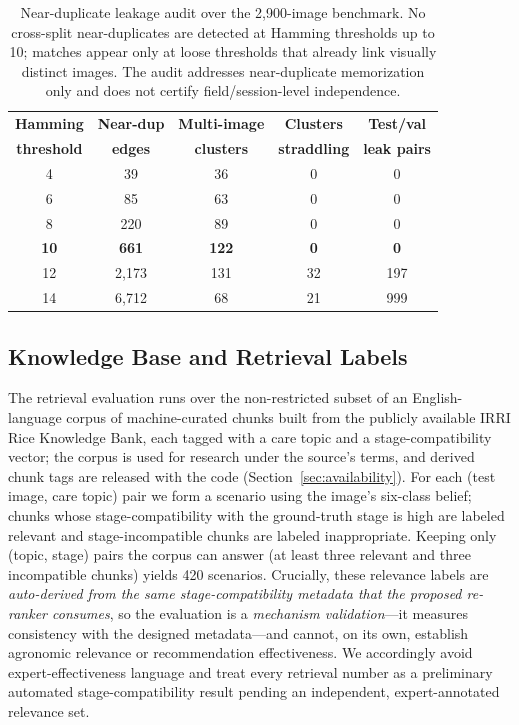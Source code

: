 \documentclass{llncs}
\begin{document}
\begin{table}[t]
\centering
\caption{Near-duplicate leakage audit over the 2{,}900-image benchmark. No cross-split near-duplicates are detected at Hamming thresholds up to 10; matches appear only at loose thresholds that already link visually distinct images. The audit addresses near-duplicate memorization only and does not certify field/session-level independence.}
\label{tab:leakage}
\small
\begin{tabular}{ccccc}
\toprule
\textbf{Hamming} & \textbf{Near-dup} & \textbf{Multi-image} & \textbf{Clusters} & \textbf{Test/val} \\
\textbf{threshold} & \textbf{edges} & \textbf{clusters} & \textbf{straddling} & \textbf{leak pairs} \\
\midrule
4 & 39 & 36 & 0 & 0 \\
6 & 85 & 63 & 0 & 0 \\
8 & 220 & 89 & 0 & 0 \\
\textbf{10} & \textbf{661} & \textbf{122} & \textbf{0} & \textbf{0} \\
12 & 2{,}173 & 131 & 32 & 197 \\
14 & 6{,}712 & 68 & 21 & 999 \\
\bottomrule
\end{tabular}
\end{table}

\subsection{Knowledge Base and Retrieval Labels}

The retrieval evaluation runs over the non-restricted subset of an English-language corpus of machine-curated chunks built from the publicly available IRRI Rice Knowledge Bank, each tagged with a care topic and a stage-compatibility vector; the corpus is used for research under the source's terms, and derived chunk tags are released with the code (Section~\ref{sec:availability}). For each (test image, care topic) pair we form a scenario using the image's six-class belief; chunks whose stage-compatibility with the ground-truth stage is high are labeled relevant and stage-incompatible chunks are labeled inappropriate. Keeping only (topic, stage) pairs the corpus can answer (at least three relevant and three incompatible chunks) yields 420 scenarios. Crucially, these relevance labels are \emph{auto-derived from the same stage-compatibility metadata that the proposed re-ranker consumes}, so the evaluation is a \emph{mechanism validation}---it measures consistency with the designed metadata---and cannot, on its own, establish agronomic relevance or recommendation effectiveness. We accordingly avoid expert-effectiveness language and treat every retrieval number as a preliminary automated stage-compatibility result pending an independent, expert-annotated relevance set.
\end{document}
